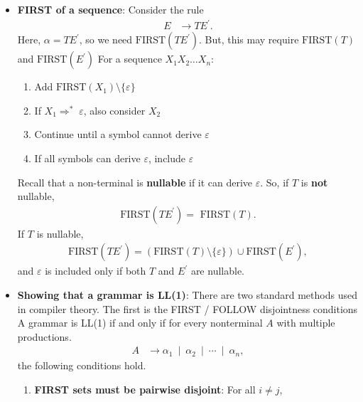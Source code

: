 \documentclass{report}
\begin{document}
\begin{itemize}
        \item \textbf{FIRST of a sequence}: Consider the rule
            \begin{align*}
                E &\to TE^{\prime}
            .\end{align*}
            Here, $\alpha = TE^{\prime}$, so we need $\text{FIRST}(TE^{\prime})$. But, this may require $\text{FIRST}(T)$ and $\text{FIRST}(E^{\prime}) $
            \bigbreak \noindent 
            For a sequence $X_{1}X_{2} \ldots X_{n}$:
            \begin{enumerate}
                \item Add $\text{FIRST}(X_{1}) \setminus \{\varepsilon\} $
                \item If $X_{1} \Rightarrow^{*}\; \varepsilon$, also consider $X_{2}$
                \item Continue until a symbol cannot derive $\varepsilon$
                \item If all symbols can derive $\varepsilon$, include $\varepsilon$
            \end{enumerate}
            Recall that a non-terminal is \textbf{nullable} if it can derive $\varepsilon$. So, if $T$ is \textbf{not} nullable,
            \begin{align*}
                \text{FIRST}(TE^{\prime}) = \text{ FIRST}(T)
            .\end{align*}
            If $T$ is nullable, 
            \begin{align*}
                \text{FIRST}(TE^{\prime}) = (\text{FIRST}(T) \setminus \{\varepsilon\}) \cup \text{FIRST}(E^{\prime})
            ,\end{align*}
            and $\varepsilon$ is included only if both $T$ and $E^{\prime}$ are nullable.
        \item \textbf{Showing that a grammar is LL(1)}: There are two standard methods used in compiler theory. The first is the FIRST / FOLLOW disjointness conditions
            A grammar is LL(1) if and only if for every nonterminal $A$ with multiple productions.
            \begin{align*}
                A &\to \alpha_{1} \ \mid \ \alpha_{2} \ \mid \ \cdots \ \mid \ \alpha_{n},
            \end{align*}
            the following conditions hold.
            \begin{enumerate}
                \item \textbf{FIRST sets must be pairwise disjoint}: For all $i\ne j$,
                    \begin{align*}

\end{align*}
\end{enumerate}
\end{itemize}
\end{document}
